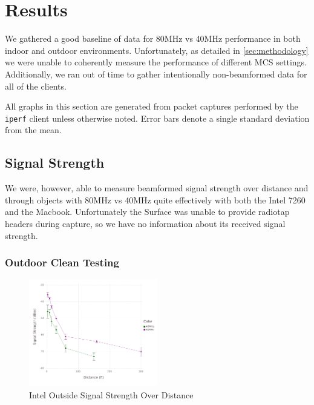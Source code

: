 \section{Results}
We gathered a good baseline of data for 80MHz vs 40MHz performance in
both indoor and outdoor environments. Unfortunately, as detailed in
\ref{sec:methodology} we were unable to coherently measure the
performance of different MCS settings. Additionally, we ran out of
time to gather intentionally non-beamformed data for all of the
clients. 

All graphs in this section are generated from packet captures
performed by the \texttt{iperf} client unless otherwise noted. Error
bars denote a single standard deviation from the mean.

\subsection{Signal Strength}
We were, however, able to measure beamformed signal strength over
distance and through objects with 80MHz vs 40MHz quite effectively
with both the Intel 7260 and the Macbook. Unfortunately the Surface
was unable to provide radiotap headers during capture, so we have no
information about its received signal strength.

\tabcolsep=0.11cm



\subsubsection{Outdoor Clean Testing}

\begin{figure}[!h]
\centering
\includegraphics[width=0.5\textwidth]{figures/Intel_Outside_Beamformed}
\caption{Intel Outside Signal Strength Over Distance}
\label{fig:inteloutsidesignal}
\end{figure}

